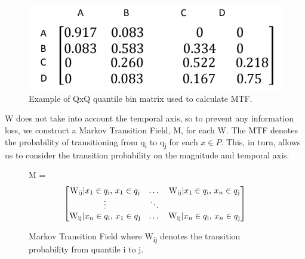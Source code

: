 \documentclass{turabian-thesis}
\begin{document}
\begin{figure}[h!]
   \begin{center}
      \includegraphics[scale=0.6]{../media/mtf_q.png}
   \end{center}
   \caption{Example of QxQ quantile bin matrix used to calculate MTF.}
   \label{fig:mtf_q}
\end{figure}
 





W does not take into account the temporal axis, so to prevent any information loss, we construct a Markov Transition Field, M, for each W. The MTF denotes the probability of transitioning from q\textsubscript{i} to q\textsubscript{j} for each $x \in P$. This, in turn, allows us to consider the transition probability on the magnitude and temporal axis.

\begin{figure}[h!]
  \centering
  M =
  \[\begin{bmatrix}

  \text{W\textsubscript{ij}} | \text{$x\textsubscript{1} \in q\textsubscript{i}$, $x_{1} \in q\textsubscript{j}$}
  & \dots &
  
  \text{W\textsubscript{ij}}  |  \text{$x_{1} \in q\textsubscript{i}$, $x_{n} \in q\textsubscript{j}$} 
  
  \\
  
  \vdots &  \ddots & \\
  
  \text{W\textsubscript{ij}} | \text{$x_{n} \in q\textsubscript{i}$, $x_{1} \in q\textsubscript{j}$}
  & \dots &
  \text{W\textsubscript{ij}} | \text{$x_{n} \in q\textsubscript{i}$, $x_{n} \in q\textsubscript{j}$} \\
  
  
  \end{bmatrix}\]
  \caption{Markov Transition Field where  W\textsubscript{ij} denotes the transition probability from quantile i to j.}
  \label{fig:mtf}
\end{figure}
\end{document}
